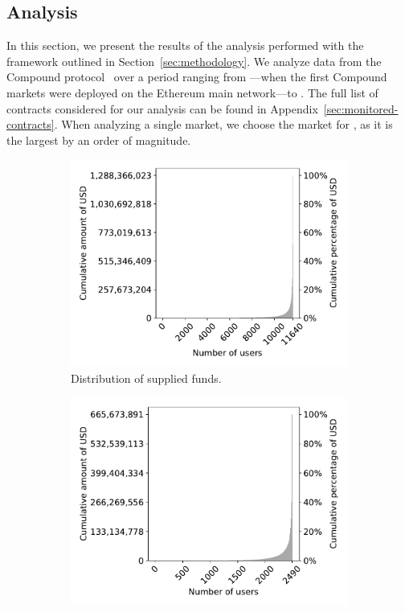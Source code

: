 \subsection{Analysis}
\label{sec:analysis}
In this section, we present the results of the analysis performed with the framework outlined in Section~\ref{sec:methodology}.
We analyze data from the Compound protocol~\cite{Leshner2018} over a period ranging from \StartDate---when the first Compound markets were deployed on the Ethereum main network---to \EndDate.
The full list of contracts considered for our analysis can be found in Appendix~\ref{sec:monitored-contracts}.
When analyzing a single market, we choose the market for , as it is the largest by an order of magnitude.

\begin{figure}[tbp]
  \begin{subfigure}{.5\textwidth}
    \centering
    \includegraphics[width=\textwidth]{./5b-economic-security/figures/suppliers-distribution.pdf}
    \caption{Distribution of supplied funds.}
    \label{fig:suppliers-distribution}
  \end{subfigure}
  \begin{subfigure}{.5\textwidth}
    \centering
    \includegraphics[width=\textwidth]{./5b-economic-security/figures/borrowers-distribution.pdf}

\end{subfigure}
\end{figure}
